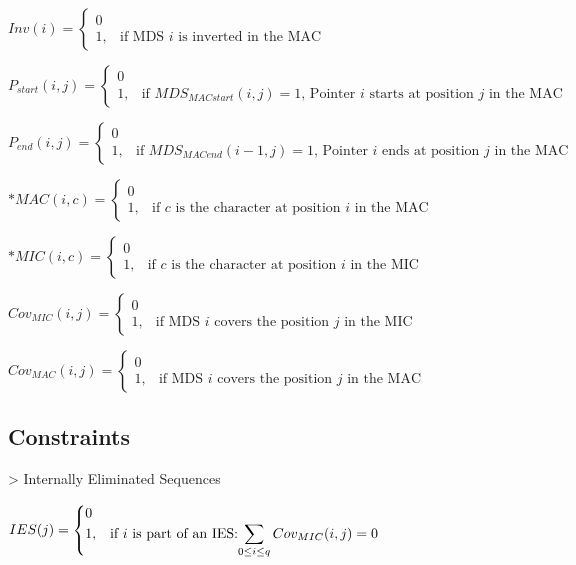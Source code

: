 $Inv(i) = \begin{cases} 0 \\ 1, & \mbox{if MDS } i\mbox{ is inverted in the MAC } \end{cases}$

$P_{start}(i,j) = \begin{cases} 0 \\ 1, & \mbox{if } MDS_{MACstart}(i,j) = 1 \mbox{, Pointer } i \mbox{ starts at position } j \mbox{ in the MAC} \end{cases}$

$P_{end}(i,j) = \begin{cases} 0 \\ 1, & \mbox{if } MDS_{MACend}(i-1,j) = 1 \mbox{, Pointer } i \mbox{ ends at position } j \mbox{ in the MAC} \end{cases}$

$*MAC(i,c) = \begin{cases} 0 \\ 1, & \mbox{if } c\mbox{ is the character at position } i \mbox{ in the MAC} \end{cases}$

$*MIC(i,c) = \begin{cases} 0 \\ 1, & \mbox{if } c\mbox{ is the character at position } i \mbox{ in the MIC} \end{cases}$

$Cov_{MIC}(i,j) = \begin{cases} 0 \\ 1, & \mbox{if MDS } i\mbox{ covers the position } j \mbox{ in the MIC} \end{cases}$

$Cov_{MAC}(i,j) = \begin{cases} 0 \\ 1, & \mbox{if MDS } i\mbox{ covers the position } j \mbox{ in the MAC} \end{cases}$


\subsection{Constraints}

> Internally Eliminated Sequences

$IES(j) = \begin{cases} 0 \\ 1, & \mbox{if } i \mbox{ is part of an IES:} \mathlarger{\sum_{0 \leq i \leq q} Cov_{MIC}(i,j) = 0} \end{cases}$

